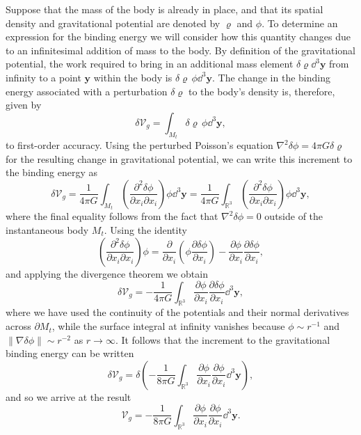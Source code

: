 Suppose that the mass of the body is already in place, 
and that its spatial density and gravitational potential are denoted by $\varrho$ and $\phi$. To determine an 
expression for the binding energy we will consider how this quantity changes due to an infinitesimal addition 
of mass to the body. By definition of the gravitational potential, the work required to bring in an additional 
mass element $\delta\varrho \dd^{3}\mathbf{y}$ from infinity to a point $\mathbf{y}$ within the body is
 $\delta\varrho\,\phi\dd^{3}\mathbf{y}$. 
The change in the binding energy associated with a perturbation $\delta\varrho$ to the body's density is, therefore, given by
\begin{equation}
\delta\mathcal{V}_{g}=\int_{M_{t}}\delta\varrho\,\phi \dd^{3}\mathbf{y},
\label{eq:11}
\end{equation}
to first-order accuracy. Using the perturbed Poisson's equation $\nabla^{2}\delta\phi=4\pi G\delta\varrho$ for 
the resulting change in gravitational potential, we can write this increment to the binding energy as
\begin{equation}
\delta\mathcal{V}_{g}=\frac{1}{4\pi G}\int_{M_{t}}\left(\frac{\partial^{2}\delta\phi}{\partial x_{i}\partial x_{i}}\right)\phi
\dd^{3}\mathbf{y}=\frac{1}{4\pi G}\int_{\mathbb{R}^{3}}\left(\frac{\partial^{2}\delta\phi}{\partial x_{i}\partial x_{i}}\right)\phi\dd^{3}\mathbf{y},
\label{eq:12}
\end{equation}
where the final equality follows from the fact that $\nabla^{2}\delta\phi=0$ outside of the instantaneous 
body $M_{t}$. Using the identity
\begin{equation}
\left(\frac{\partial^{2}\delta\phi}{\partial x_{i}\partial x_{i}}\right)\phi=\frac{\partial}{\partial x_{i}}
\left(\phi\frac{\partial\delta\phi}{\partial x_{i}}\right)-\frac{\partial\phi}{\partial x_{i}}\frac{\partial\delta\phi}{\partial x_{i}},
\label{eq:13}
\end{equation}
and applying the divergence theorem we obtain
\begin{equation}
\delta\mathcal{V}_{g}=-\frac{1}{4\pi G}\int_{\mathbb{R}^{3}}\frac{\partial\phi}{\partial x_{i}}\frac{\partial\delta\phi}{\partial x_{i}}\dd^{3}\mathbf{y},
\label{eq:14}
\end{equation}
where we have used the continuity of the potentials and their normal derivatives across $\partial M_{t}$, while the 
surface integral at infinity vanishes because $\phi\sim r^{-1}$ and $\|\nabla\delta\phi\|\sim r^{-2}$ as $r\rightarrow\infty$. It follows that the increment to the gravitational binding energy can be written
\begin{equation}
\delta\mathcal{V}_{g}=\delta\left(-\frac{1}{8\pi G}\int_{\mathbb{R}^{3}}\frac{\partial\phi}{\partial x_{i}}
\frac{\partial\phi}{\partial x_{i}}\dd^{3}\mathbf{y}\right),
\label{eq:15}
\end{equation}
and so we arrive at the result
\begin{equation}
\mathcal{V}_{g}=-\frac{1}{8\pi G}\int_{\mathbb{R}^{3}}\frac{\partial\phi}{\partial x_{i}}\frac{\partial\phi}
{\partial x_{i}}\dd^{3}\mathbf{y}.
\label{eq:16}
\end{equation}

